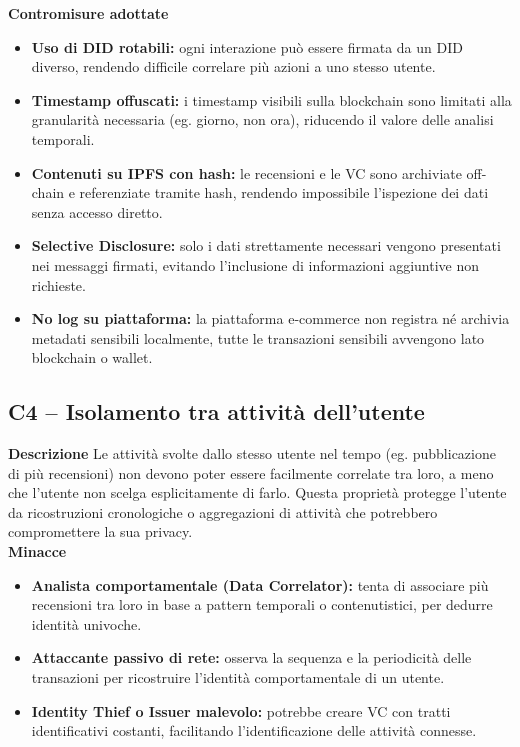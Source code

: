             \noindent \textbf{Contromisure adottate}
                \begin{itemize}
                    \item \textbf{Uso di DID rotabili:} ogni interazione può essere firmata da un DID diverso, rendendo difficile correlare più azioni a uno stesso utente.
    
                    \item \textbf{Timestamp offuscati:} i timestamp visibili sulla blockchain sono limitati alla granularità necessaria (eg. giorno, non ora), riducendo il valore delle analisi temporali.
    
                    \item \textbf{Contenuti su IPFS con hash:} le recensioni e le VC sono archiviate off-chain e referenziate tramite hash, rendendo impossibile l'ispezione dei dati senza accesso diretto.
    
                    \item \textbf{Selective Disclosure:} solo i dati strettamente necessari vengono presentati nei messaggi firmati, evitando l'inclusione di informazioni aggiuntive non richieste.
    
                    \item \textbf{No log su piattaforma:} la piattaforma e-commerce non registra né archivia metadati sensibili localmente, tutte le transazioni sensibili avvengono lato blockchain o wallet.
                \end{itemize}
    
        \subsection{C4 – Isolamento tra attività dell'utente}
            \noindent \textbf{Descrizione}
                Le attività svolte dallo stesso utente nel tempo (eg. pubblicazione di più recensioni) non devono poter essere facilmente correlate tra loro, a meno che l'utente non scelga esplicitamente di farlo. Questa proprietà protegge l'utente da ricostruzioni cronologiche o aggregazioni di attività che potrebbero compromettere la sua privacy. \\
    
            \noindent \textbf{Minacce}
                \begin{itemize}
                    \item \textbf{Analista comportamentale (Data Correlator):} tenta di associare più recensioni tra loro in base a pattern temporali o contenutistici, per dedurre identità univoche.
    
                    \item \textbf{Attaccante passivo di rete:} osserva la sequenza e la periodicità delle transazioni per ricostruire l'identità comportamentale di un utente.
    
                    \item \textbf{Identity Thief o Issuer malevolo:} potrebbe creare VC con tratti identificativi costanti, facilitando l'identificazione delle attività connesse.
                \end{itemize}
    
